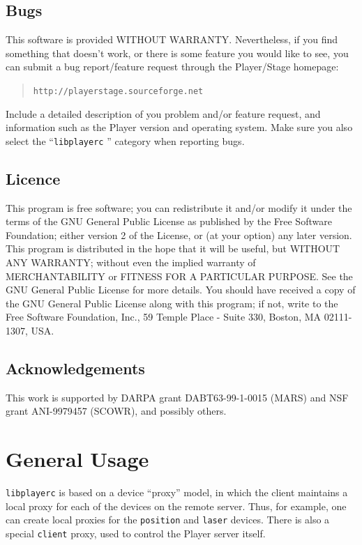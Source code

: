 \documentclass[11pt]{report}
\def\HOMEPAGE {{\tt http://playerstage.sourceforge.net}}
\def\libplayerc {{\tt libplayerc} }
\begin{document}
\section{Bugs}

This software is provided WITHOUT WARRANTY.  Nevertheless, if you find
something that doesn't work, or there is some feature you would like
to see, you can submit a bug report/feature request through the
Player/Stage homepage:
\begin{quote} 
\HOMEPAGE
\end{quote}
Include a detailed description of you problem and/or feature request,
and information such as the Player version and operating system.  Make
sure you also select the ``\libplayerc'' category when reporting bugs.


\section{Licence}

This program is free software; you can redistribute it and/or modify
it under the terms of the GNU General Public License as published by
the Free Software Foundation; either version 2 of the License, or (at
your option) any later version.  This program is distributed in the
hope that it will be useful, but WITHOUT ANY WARRANTY; without even
the implied warranty of MERCHANTABILITY or FITNESS FOR A PARTICULAR
PURPOSE.  See the GNU General Public License for more details.  You
should have received a copy of the GNU General Public License along
with this program; if not, write to the Free Software Foundation,
Inc., 59 Temple Place - Suite 330, Boston, MA 02111-1307, USA.

\section{Acknowledgements}

This work is supported by DARPA grant DABT63-99-1-0015 (MARS) and NSF
grant ANI-9979457 (SCOWR), and possibly others.


\chapter{General Usage}

\libplayerc is based on a device ``proxy'' model, in which the client
maintains a local proxy for each of the devices on the remote server.
Thus, for example, one can create local proxies for the {\tt position}
and {\tt laser} devices.  There is also a special {\tt client} proxy,
used to control the Player server itself.  
\end{document}
